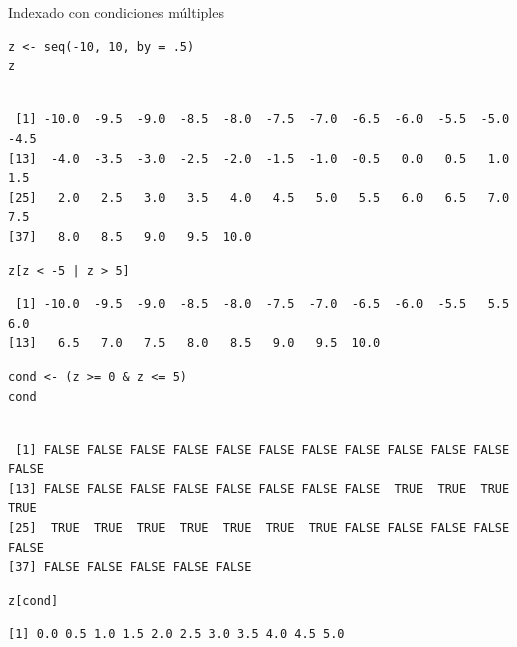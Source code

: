 \documentclass[aspectratio=169, usenames,svgnames,dvipsnames]{beamer}
\begin{document}
\begin{frame}[label={sec:orgf86ca46},fragile]{Indexado con condiciones múltiples}
 \lstset{language=r,label= ,caption= ,captionpos=b,numbers=none}
\begin{lstlisting}
z <- seq(-10, 10, by = .5)
z
\end{lstlisting}

\begin{verbatim}

 [1] -10.0  -9.5  -9.0  -8.5  -8.0  -7.5  -7.0  -6.5  -6.0  -5.5  -5.0  -4.5
[13]  -4.0  -3.5  -3.0  -2.5  -2.0  -1.5  -1.0  -0.5   0.0   0.5   1.0   1.5
[25]   2.0   2.5   3.0   3.5   4.0   4.5   5.0   5.5   6.0   6.5   7.0   7.5
[37]   8.0   8.5   9.0   9.5  10.0
\end{verbatim}


\lstset{language=r,label= ,caption= ,captionpos=b,numbers=none}
\begin{lstlisting}
z[z < -5 | z > 5]
\end{lstlisting}

\begin{verbatim}
 [1] -10.0  -9.5  -9.0  -8.5  -8.0  -7.5  -7.0  -6.5  -6.0  -5.5   5.5   6.0
[13]   6.5   7.0   7.5   8.0   8.5   9.0   9.5  10.0
\end{verbatim}


\lstset{language=r,label= ,caption= ,captionpos=b,numbers=none}
\begin{lstlisting}
cond <- (z >= 0 & z <= 5)
cond
\end{lstlisting}

\begin{verbatim}

 [1] FALSE FALSE FALSE FALSE FALSE FALSE FALSE FALSE FALSE FALSE FALSE FALSE
[13] FALSE FALSE FALSE FALSE FALSE FALSE FALSE FALSE  TRUE  TRUE  TRUE  TRUE
[25]  TRUE  TRUE  TRUE  TRUE  TRUE  TRUE  TRUE FALSE FALSE FALSE FALSE FALSE
[37] FALSE FALSE FALSE FALSE FALSE
\end{verbatim}


\lstset{language=r,label= ,caption= ,captionpos=b,numbers=none}
\begin{lstlisting}
z[cond]
\end{lstlisting}

\begin{verbatim}
[1] 0.0 0.5 1.0 1.5 2.0 2.5 3.0 3.5 4.0 4.5 5.0
\end{verbatim}
\end{frame}
\end{document}
